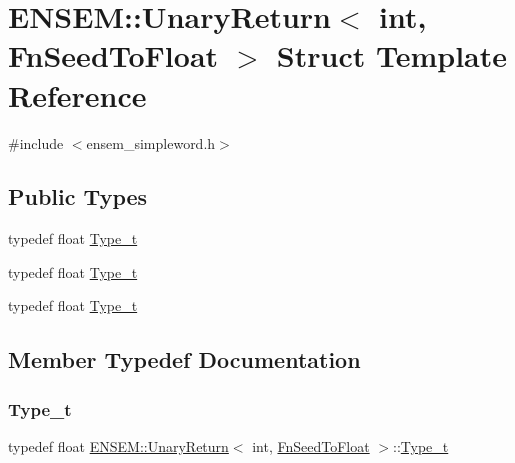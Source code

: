 \hypertarget{structENSEM_1_1UnaryReturn_3_01int_00_01FnSeedToFloat_01_4}{}\section{E\+N\+S\+EM\+:\+:Unary\+Return$<$ int, Fn\+Seed\+To\+Float $>$ Struct Template Reference}
\label{structENSEM_1_1UnaryReturn_3_01int_00_01FnSeedToFloat_01_4}


{\ttfamily \#include $<$ensem\+\_\+simpleword.\+h$>$}

\subsection*{Public Types}
\begin{DoxyCompactItemize}
\item 
typedef float \mbox{\hyperlink{structENSEM_1_1UnaryReturn_3_01int_00_01FnSeedToFloat_01_4_ae22c1dee5b905b38ddda98907a2eb2fd}{Type\+\_\+t}}
\item 
typedef float \mbox{\hyperlink{structENSEM_1_1UnaryReturn_3_01int_00_01FnSeedToFloat_01_4_ae22c1dee5b905b38ddda98907a2eb2fd}{Type\+\_\+t}}
\item 
typedef float \mbox{\hyperlink{structENSEM_1_1UnaryReturn_3_01int_00_01FnSeedToFloat_01_4_ae22c1dee5b905b38ddda98907a2eb2fd}{Type\+\_\+t}}
\end{DoxyCompactItemize}


\subsection{Member Typedef Documentation}
\mbox{\label{structENSEM_1_1UnaryReturn_3_01int_00_01FnSeedToFloat_01_4_ae22c1dee5b905b38ddda98907a2eb2fd}} 
\subsubsection{\texorpdfstring{Type\_t}{Type\_t}\hspace{0.1cm}{\footnotesize\ttfamily [1/3]}}
{\footnotesize\ttfamily typedef float \mbox{\hyperlink{structENSEM_1_1UnaryReturn}{E\+N\+S\+E\+M\+::\+Unary\+Return}}$<$ int, \mbox{\hyperlink{structENSEM_1_1FnSeedToFloat}{Fn\+Seed\+To\+Float}} $>$\+::\mbox{\hyperlink{structENSEM_1_1UnaryReturn_3_01int_00_01FnSeedToFloat_01_4_ae22c1dee5b905b38ddda98907a2eb2fd}{Type\+\_\+t}}}

